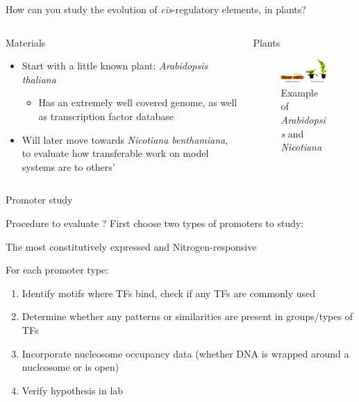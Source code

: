 \documentclass[t, aspectratio=169, allowframebreaks]{beamer}
\begin{document}
\begin{frame}[label={sec:orgf0ff41c}]{How can you study the evolution of \emph{cis}-regulatory elements, in plants?}
\begin{columns}
\begin{column}{0.5\columnwidth}
\begin{block}{Materials}
\begin{itemize}
\item Start with a little known plant: \emph{Arabidopsis thaliana}
\begin{itemize}
\item Has an extremely well covered genome, as well as transcription factor database
\end{itemize}
\item Will later move towards \emph{Nicotiana benthamiana}, to evaluate how transferable work on model systems are to others'
\end{itemize}
\end{block}
\end{column}

\begin{column}{0.5\columnwidth}
\begin{block}{Plants}
\begin{figure}[htbp]
\centering
\includegraphics[width=6.4cm]{./plants.png}
\caption{\label{fig:org0024819}
Example of \emph{Arabidopsis} and \emph{Nicotiana}}
\end{figure}
\end{block}
\end{column}
\end{columns}
\end{frame}

\begin{frame}[label={sec:org2e03c79}]{Promoter study}
\begin{block}{Procedure to evaluate ?}
First choose two types of promoters to study:

\alert{The most constitutively expressed} and \alert{Nitrogen-responsive}

For each promoter type:
\begin{enumerate}
\item Identify motifs where TFs bind, check if any TFs are commonly used
\item Determine whether any patterns or similarities are present in groups/types of TFs
\item Incorporate nucleosome occupancy data (whether DNA is wrapped around a nucleosome or is open)
\item Verify hypothesis in lab
\end{enumerate}
\end{block}
\end{frame}
\end{document}
